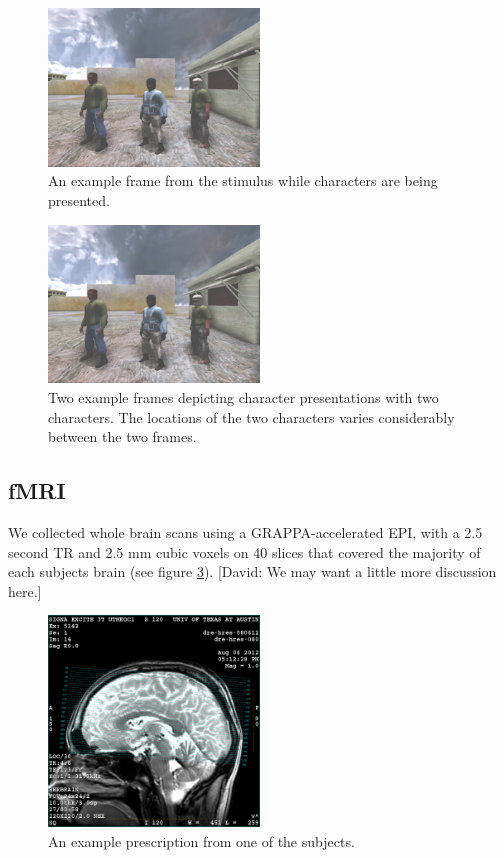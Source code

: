 \documentclass[final]{article}
\begin{document}
\begin{figure}[!htbp]
\centering
\includegraphics[width=0.5\textwidth]{figures/stimulus-characters}
\caption{An example frame from the stimulus while characters are being presented.}
\label{fig:stimulus-characters}
\end{figure}

\begin{figure}[!htbp]
\centering
\includegraphics[width=0.5\textwidth]{figures/stimulus-location}
\caption{Two example frames depicting character presentations with two characters. The locations of the two characters varies considerably between the two frames.}
\label{fig:stimulus-location}
\end{figure}

\subsection{fMRI}
We collected whole brain scans using a GRAPPA-accelerated EPI, with a 2.5 second TR and 2.5 mm cubic voxels on 40 slices that covered the majority of each subjects brain (see figure \ref{fig:rx}).
[David: We may want a little more discussion here.]

\begin{figure}[!htbp]
\centering
\includegraphics[width=0.5\textwidth]{figures/rx}
\caption{An example prescription from one of the subjects.}
\label{fig:rx}
\end{figure}
\end{document}
